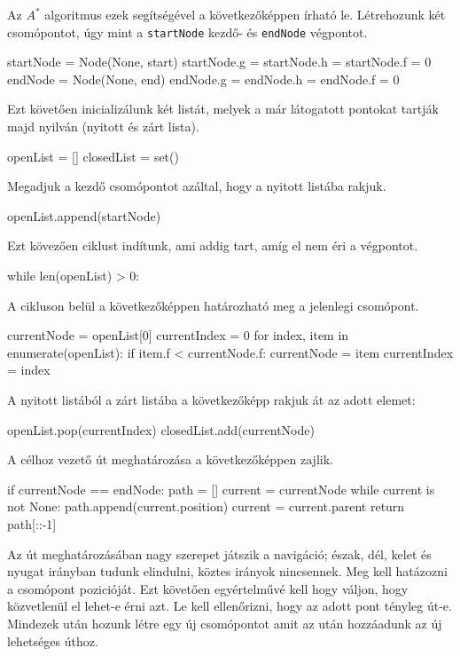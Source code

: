 Az $A^{*}$ algoritmus ezek segítségével a következőképpen írható le.
Létrehozunk két csomópontot, úgy mint a \texttt{startNode} kezdő- és \texttt{endNode} végpontot.
\begin{python}
startNode = Node(None, start)
startNode.g = startNode.h = startNode.f = 0
endNode = Node(None, end)
endNode.g = endNode.h = endNode.f = 0
\end{python}
Ezt követően inicializálunk két listát, melyek a már látogatott pontokat tartják majd nyilván (nyitott és zárt lista).
\begin{python}
openList = []
closedList = set()
\end{python}
Megadjuk a kezdő csomópontot azáltal, hogy a nyitott listába rakjuk.
\begin{python}
openList.append(startNode)
\end{python}
Ezt kövezően ciklust indítunk, ami addig tart, amíg el nem éri a végpontot.
\begin{python}
while len(openList) > 0:
\end{python}
A cikluson belül a következőképpen határozható meg a jelenlegi csomópont.
\begin{python}
currentNode = openList[0]
currentIndex = 0
for index, item in enumerate(openList):
   if item.f < currentNode.f:
       currentNode = item
       currentIndex = index
\end{python}      
A nyitott listából a zárt listába a következőképp rakjuk át az adott elemet:
\begin{python}
openList.pop(currentIndex)
closedList.add(currentNode)
\end{python}
A célhoz vezető út meghatározása a következőképpen zajlik.
\begin{python}
if currentNode == endNode:
    path = []
    current = currentNode
    while current is not None:
        path.append(current.position)
        current = current.parent
    return path[::-1]
\end{python}

Az út meghatározásában nagy szerepet játszik a navigáció; észak, dél, kelet és nyugat irányban tudunk elindulni, köztes irányok nincsennek. Meg kell hatázozni a csomópont pozicióját. Ezt követően egyértelművé kell hogy váljon, hogy közvetlenül el lehet-e érni azt. Le kell ellenőrizni, hogy az adott pont tényleg út-e. Mindezek után hozunk létre egy új csomópontot amit az után hozzáadunk az új lehetséges úthoz.

